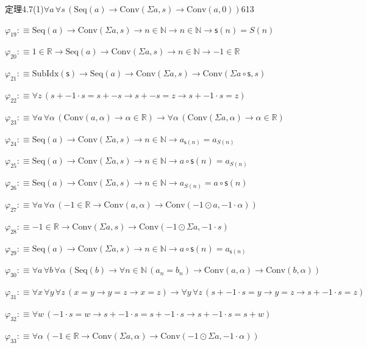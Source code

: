 \begin{fullproof}{定理4.7(1)}{$\forall a\,\forall s\,(\mathrm{Seq}(a) \to \mathrm{Conv}(\Sigma a,s) \to \mathrm{Conv}(a,0))$}{613}
\begin{abbrevlist}
\item $\varphi_{19} :\equiv \mathrm{Seq}(a) \to \mathrm{Conv}(\Sigma a,s) \to n \in \mathbb{N} \to n \in \mathbb{N} \to \mathsf{s}(n) = S(n)$
\item $\varphi_{20} :\equiv 1 \in \mathbb{R} \to \mathrm{Seq}(a) \to \mathrm{Conv}(\Sigma a,s) \to n \in \mathbb{N} \to -1 \in \mathbb{R}$
\item $\varphi_{21} :\equiv \mathrm{SubIdx}(\mathsf{s}) \to \mathrm{Seq}(a) \to \mathrm{Conv}(\Sigma a,s) \to \mathrm{Conv}(\Sigma a \circ \mathsf{s},s)$
\item $\varphi_{22} :\equiv \forall z\,(s + -1 \cdot s = s + -s \to s + -s = z \to s + -1 \cdot s = z)$
\item $\varphi_{23} :\equiv \forall a\,\forall \alpha\,(\mathrm{Conv}(a,\alpha) \to \alpha \in \mathbb{R}) \to \forall \alpha\,(\mathrm{Conv}(\Sigma a,\alpha) \to \alpha \in \mathbb{R})$
\item $\varphi_{24} :\equiv \mathrm{Seq}(a) \to \mathrm{Conv}(\Sigma a,s) \to n \in \mathbb{N} \to a_{\mathsf{s}(n)} = a_{S(n)}$
\item $\varphi_{25} :\equiv \mathrm{Seq}(a) \to \mathrm{Conv}(\Sigma a,s) \to n \in \mathbb{N} \to a \circ \mathsf{s}(n) = a_{S(n)}$
\item $\varphi_{26} :\equiv \mathrm{Seq}(a) \to \mathrm{Conv}(\Sigma a,s) \to n \in \mathbb{N} \to a_{S(n)} = a \circ \mathsf{s}(n)$
\item $\varphi_{27} :\equiv \forall a\,\forall \alpha\,(-1 \in \mathbb{R} \to \mathrm{Conv}(a,\alpha) \to \mathrm{Conv}(-1 \odot a,-1 \cdot \alpha))$
\item $\varphi_{28} :\equiv -1 \in \mathbb{R} \to \mathrm{Conv}(\Sigma a,s) \to \mathrm{Conv}(-1 \odot \Sigma a,-1 \cdot s)$
\item $\varphi_{29} :\equiv \mathrm{Seq}(a) \to \mathrm{Conv}(\Sigma a,s) \to n \in \mathbb{N} \to a \circ \mathsf{s}(n) = a_{\mathsf{s}(n)}$
\item $\varphi_{30} :\equiv \forall a\,\forall b\,\forall \alpha\,(\mathrm{Seq}(b) \to \forall n \in \mathbb{N}\,(a_{n} = b_{n}) \to \mathrm{Conv}(a,\alpha) \to \mathrm{Conv}(b,\alpha))$
\item $\varphi_{31} :\equiv \forall x\,\forall y\,\forall z\,(x = y \to y = z \to x = z) \to \forall y\,\forall z\,(s + -1 \cdot s = y \to y = z \to s + -1 \cdot s = z)$
\item $\varphi_{32} :\equiv \forall w\,(-1 \cdot s = w \to s + -1 \cdot s = s + -1 \cdot s \to s + -1 \cdot s = s + w)$
\item $\varphi_{33} :\equiv \forall \alpha\,(-1 \in \mathbb{R} \to \mathrm{Conv}(\Sigma a,\alpha) \to \mathrm{Conv}(-1 \odot \Sigma a,-1 \cdot \alpha))$

\end{abbrevlist}
\end{fullproof}
